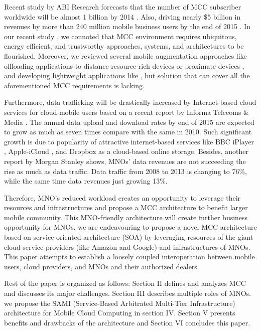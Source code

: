 \documentclass[conference]{IEEEtran}
\begin{document}
Recent study by ABI Research forecasts that the number of MCC subscriber worldwide will be almost 1 billion by 2014 \cite{ABIsub}. Also, driving nearly \$5 billion in revenues by more than 240 million mobile business users by the end of 2015 \cite{ABIResearch}. In our recent study \cite{ZohrehSanaei2012}, we connoted that MCC environment requires ubiquitous, energy efficient, and trustworthy approaches, systems, and architectures to be flourished. Moreover, we reviewed several mobile augmentation approaches \cite{SaeidAbolfazli2012} like offloading applications to distance resource-rich devices \cite{Chun2011} or proximate devices \cite{Satyanarayanan2009}, and developing lightweight applications like \cite{March2011}, but solution that can cover all the aforementioned MCC requirements is lacking.

Furthermore, data trafficking will be drastically increased by Internet-based cloud services for cloud-mobile users based on a recent report by Informa Telecoms \& Media \cite{internettraffic}. The annual data upload and download rates by end of 2015 are expected to grow as much as seven times compare with the same in 2010. Such significant growth is due to popularity of attractive internet-based services like BBC iPlayer \cite{iPlayer}, Apple-iCloud \cite{icloud}, and Dropbox \cite{dropbox} as a cloud-based online storage. Besides, another report by Morgan Stanley \cite{Morgan2009} shows, MNOs’ data revenues are not succeeding the rise as much as data traffic. Data traffic from 2008 to 2013 is changing to 76\%, while the same time data revenues just growing 13\%. 

Therefore, MNO's reduced workload creates an opportunity to leverage their resources and infrastructures and propose a MCC architecture to benefit larger mobile community. This MNO-friendly architecture will create further business opportunity for MNOs. we are endeavouring to propose a novel MCC architecture based on service oriented architecture (SOA) \cite{Huhns2005} by leveraging resources of the giant cloud service providers (like Amazon and Google) and infrastructures of MNOs. This paper attempts to establish a loosely coupled interoperation between mobile users, cloud providers, and MNOs and their authorized dealers.

Rest of the paper is organized as follows: Section II defines and analyzes MCC and discusses its major challenges. Section III describes multiple roles of MNOs. we propose the SAMI (Service-Based Arbitrated Multi-Tier Infrastructure) architecture for Mobile Cloud Computing in section IV. Section V presents benefits and drawbacks of the architecture and Section VI concludes this paper.
\end{document}

